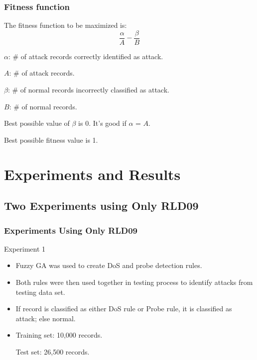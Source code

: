 \documentclass{beamer}
\newcommand{\linespace}{\vskip 0.25cm}
\begin{document}
\begin{frame}
	\frametitle{Fitness function}
	The fitness function to be maximized is:
	\begin{equation*}
	\frac{\alpha}{A} - \frac{\beta}{B}
	\end{equation*}

	$\alpha$: \# of attack records correctly identified as attack.

	$A$: \# of attack records.

	$\beta$: \# of normal records incorrectly classified as attack.
	
	$B$: \# of normal records.

\linespace
\linespace
\linespace
\linespace
Best possible value of $\beta$ is 0.
It's good if $\alpha$ = $A$.

Best possible fitness value is 1.
\end{frame}
\section[Experiments and Results]{Experiments and Results}
\subsection{Two Experiments using Only RLD09}
\begin{frame}
	\frametitle{Experiments Using Only RLD09}
	Experiment 1
	\begin{itemize}
		\item Fuzzy GA was used to create DoS and probe detection rules. 
		
		\item Both rules were then used together in testing process to identify attacks from testing data set.
		
		\linespace
		\linespace
		
		\item If record is classified as either DoS rule or Probe rule, it is classified as attack; else normal.

		\linespace
		\linespace
		
		\item Training set: 10,000 records.
		
		Test set: 26,500 records.
\end{itemize}
\end{frame}
\end{document}
